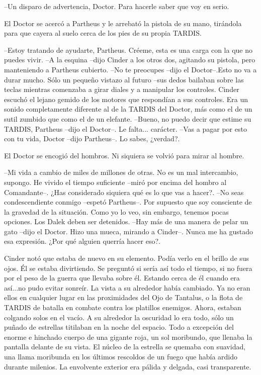 --Un disparo de advertencia, Doctor. Para hacerle saber que voy en serio.

El Doctor se acercó a Partheus y le arrebató la pistola de su mano, tirándola para que cayera al suelo cerca de los pies de su propia TARDIS.

--Estoy tratando de ayudarte, Partheus. Créeme, esta es una carga con la que no puedes vivir.
--A la esquina --dijo Cinder a los otros dos, agitando su pistola, pero manteniendo a Partheus cubierto.
--No te preocupes --dijo el Doctor--.Esto no va a durar mucho. Sólo un pequeño vistazo al futuro --sus dedos bailaban sobre las teclas mientras comenzaba a girar diales y a manipular los controles. Cinder escuchó el lejano gemido de los motores que respondían a sus controles. Era un sonido completamente diferente al de la TARDIS del Doctor, más como el de un sutil zumbido que como el de un elefante.
--Bueno, no puedo decir que estime su TARDIS, Partheus --dijo el Doctor--. Le falta... carácter.
--Vas a pagar por esto con tu vida, Doctor --dijo Partheus--. Lo sabes, ¿verdad?.

El Doctor se encogió del hombros. Ni siquiera se volvió para mirar al hombre. 

--Mi vida a cambio de miles de millones de otras. No es un mal intercambio, supongo. He vivido el tiempo suficiente --miró por encima del hombro al Comandante--. ¿Has considerado siquiera qué es lo que vas a hacer?.
--No seas condescendiente conmigo --espetó Partheus--. Por supuesto que soy consciente de la gravedad de la situación. Como yo lo veo, sin embargo, tenemos pocas opciones. Los Dalek deben ser detenidos.
--Hay más de una manera de pelar un gato --dijo el Doctor. Hizo una mueca, mirando a Cinder--. Nunca me ha gustado esa expresión. ¿Por qué alguien querría hacer eso?.

Cinder notó que estaba de nuevo en su elemento. Podía verlo en el brillo de sus ojos. Él se estaba divirtiendo. Se preguntó si sería así todo el tiempo, si no fuera por el peso de la guerra que llevaba sobre él. Estando cerca de él cuando era así...no pudo evitar sonreír.
La vista a su alrededor había cambiado. Ya no eran ellos en cualquier lugar en las proximidades del Ojo de Tantalus, o la flota de TARDIS de batalla en combate contra los platillos enemigos.
Ahora, estaban colgando solos en el vacío. A su alrededor la oscuridad lo era todo, sólo un puñado de estrellas titilaban en la noche del espacio. Todo a excepción del enorme e hinchado cuerpo de una gigante roja, un sol moribundo, que llenaba la pantalla delante de su vista. El núcleo de la estrella se quemaba con suavidad, una llama moribunda en los últimos rescoldos de un fuego que había ardido durante milenios. La envolvente exterior era pálida y delgada, casi transparente.

